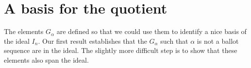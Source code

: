 \documentclass[11pt,oneside]{amsart}
\newcommand{\defncolor}{\color{darkred}}
\newcommand{\defn}[1]{{\defncolor\emph{#1}}} %
\theoremstyle{definition}
\newtheorem{example}[theorem]{Example}
\numberwithin{equation}{section}
\newcommand{\mike}[1]{\todo[size=\tiny,color=lime!30]{#1 \\ \hfill --- Mike}}
\begin{document}
\section{A basis for the quotient}\label{sec:ballotbasis}

%

The elements $G_\alpha$ are defined so that we could use them to
identify a nice basis of the ideal $I_n$.  Our first result establishes
that the $G_\alpha$ such that $\alpha$ is not a ballot sequence
are in the ideal.  The slightly more difficult step is to show
that these elements also span the ideal.
\end{document}
